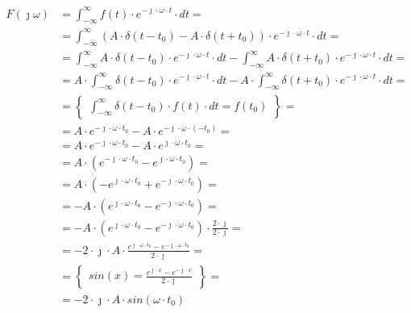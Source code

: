 \begin{task}
\begin{align*}
F(\jmath \omega )&=\int_{-\infty }^{\infty}f(t) \cdot e^{-\jmath \cdot \omega \cdot t}\cdot dt=\\
&=\int_{-\infty }^{\infty} \left( A \cdot \delta(t-t_0) - A \cdot \delta(t+t_0) \right)\cdot e^{-\jmath \cdot \omega \cdot t} \cdot dt=\\
&=\int_{-\infty }^{\infty} A \cdot \delta(t-t_0) \cdot e^{-\jmath \cdot \omega \cdot t} \cdot dt - \int_{-\infty }^{\infty} A \cdot \delta(t+t_0) \cdot e^{-\jmath \cdot \omega \cdot t} \cdot dt=\\
&= A \cdot \int_{-\infty }^{\infty} \delta(t-t_0) \cdot e^{-\jmath \cdot \omega \cdot t} \cdot dt -  A \cdot \int_{-\infty }^{\infty} \delta(t+t_0) \cdot e^{-\jmath \cdot \omega \cdot t} \cdot dt=\\
&=\begin{Bmatrix}
\int_{-\infty }^{\infty} \delta(t-t_0) \cdot f(t) \cdot dt = f(t_0)
\end{Bmatrix}=\\
&= A \cdot e^{-\jmath \cdot \omega \cdot t_0} -  A \cdot e^{-\jmath \cdot \omega \cdot (-t_0)}=\\
&= A \cdot e^{-\jmath \cdot \omega \cdot t_0} -  A \cdot e^{\jmath \cdot \omega \cdot t_0}=\\
&= A \cdot \left(e^{-\jmath \cdot \omega \cdot t_0} -  e^{\jmath \cdot \omega \cdot t_0}\right)=\\
&= A \cdot \left(-  e^{\jmath \cdot \omega \cdot t_0} +  e^{-\jmath \cdot \omega \cdot t_0}\right)=\\
&= -A \cdot \left(e^{\jmath \cdot \omega \cdot t_0} -  e^{-\jmath \cdot \omega \cdot t_0}\right)=\\
&= -A \cdot \left(e^{\jmath \cdot \omega \cdot t_0} -  e^{-\jmath \cdot \omega \cdot t_0}\right)\cdot \frac{2\cdot \jmath}{2\cdot \jmath}=\\
&= -2 \cdot \jmath \cdot A \cdot \frac{e^{\jmath \cdot \omega \cdot t_0} -  e^{-\jmath \cdot \omega \cdot t_0}}{2\cdot \jmath}=\\
&=\begin{Bmatrix}
sin(x) = \frac{e^{\jmath \cdot x} - e^{-\jmath \cdot x}}{2\cdot \jmath}
\end{Bmatrix}=\\
&= -2 \cdot \jmath \cdot A \cdot sin(\omega \cdot t_0)
\end{align*}



\end{task}
